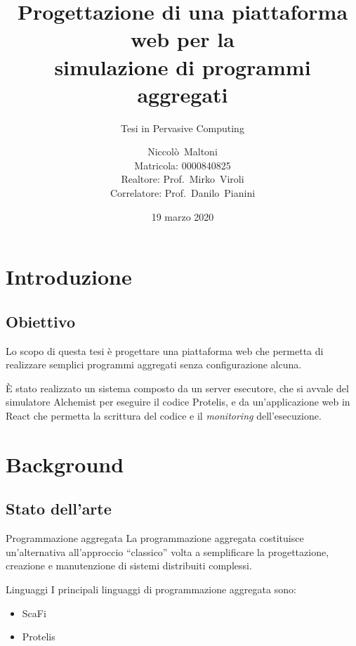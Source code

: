 \documentclass[
  usepdftitle=false,  %
  bigger,               %
  lualatex,           %
  italian             %
]{beamer}
\title[%
  WebProtelis%
]{%
  Progettazione di una piattaforma web per la\\simulazione di programmi aggregati%
}
\subtitle{Tesi in Pervasive Computing}
\author[Niccolò~Maltoni (0000840825)]{%
  Niccolò~Maltoni%
  \\\small{Matricola: 0000840825}%
  \\\vspace{10pt} \small{Realtore: Prof.~Mirko~Viroli \\Correlatore: Prof.~Danilo~Pianini}
}
\institute[]{%
  Alma Mater Studiorum - Università di Bologna\\%
  Campus di Cesena%
}
\date{19 marzo 2020}
\begin{document}
  \frame{\titlepage}

  \section{Introduzione}
    \subsection{Obiettivo}
    \begin{frame}{\insertsection}{\insertsubsection}

      Lo scopo di questa tesi è progettare una piattaforma web che permetta di realizzare semplici programmi aggregati senza configurazione alcuna.

      \medskip
      \pause

      È stato realizzato un sistema composto da un server esecutore, che si avvale del simulatore Alchemist per eseguire il codice Protelis,
      e da un'applicazione web in React che permetta la scrittura del codice e il \emph{monitoring} dell'esecuzione.

    \end{frame}

  \section{Background}
    \subsection{Stato dell'arte}

    \begin{frame}{\insertsectionhead}{\insertsubsectionhead}

      \begin{block}{Programmazione aggregata} %
        La programmazione aggregata costituisce un'alternativa all'approccio ``classico'' volta a semplificare la progettazione, creazione e manutenzione di sistemi distribuiti complessi.
      \end{block}

      \pause

      \begin{block}{Linguaggi} %
        I principali linguaggi di programmazione aggregata sono:

        \begin{itemize}[<+(1)->]
          \item ScaFi
          \item Protelis
        \end{itemize}
      \end{block}

    \end{frame}
\end{document}
